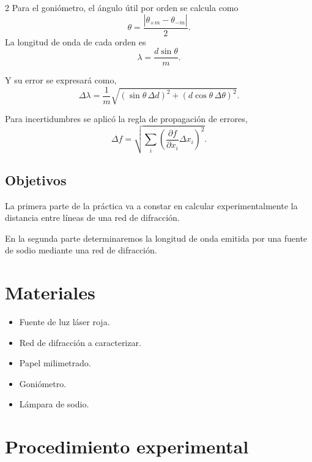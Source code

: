 \documentclass[12pt,a4paper]{article}
\begin{document}
\begin{multicols}{2}
Para el goniómetro, el ángulo útil por orden se calcula como
\begin{equation}
    \theta = \frac{|\theta_{+m}-\theta_{-m}|}{2}.
    \label{eq:theta_gonio}
\end{equation}
La longitud de onda de cada orden es
\begin{equation}
    \lambda = \frac{d\sin\theta}{m}.
    \label{eq:lambda_gonio}
\end{equation}

Y su error se expresará como,
\begin{equation}
    \Delta\lambda =
    \frac{1}{m}
    \sqrt{
    (\sin\theta\,\Delta d)^2
    +(d\cos\theta\,\Delta\theta)^2}.
    \label{eq:dlambda}
\end{equation}

Para incertidumbres se aplicó la regla de propagación de errores,
\begin{equation}
    \Delta f = \sqrt{\sum_i\left(\frac{\partial f}{\partial x_i}\Delta x_i\right)^2}.
    \label{eq:rss}
\end{equation}

\subsection{Objetivos}

La primera parte de la práctica va a constar en calcular experimentalmente la distancia entre líneas de una red de difracción.

En la segunda parte determinaremos la longitud de onda emitida por una fuente de sodio mediante una red de difracción.

\section{Materiales}

\begin{itemize}
    \item Fuente de luz láser roja.
    \item Red de difracción a caracterizar.
    \item Papel milimetrado.
    \item Goniómetro.
    \item Lámpara de sodio.
\end{itemize}

\section{Procedimiento experimental}


\end{multicols}
\end{document}
